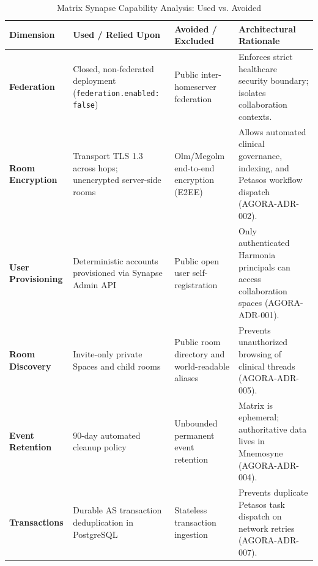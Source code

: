 \begin{table}[htbp]
\centering
\scriptsize
\begin{tabularx}{\textwidth}{P{3.0cm} P{3.8cm} P{3.8cm} Y}
\toprule
\textbf{Dimension} & \textbf{Used / Relied Upon} & \textbf{Avoided / Excluded} & \textbf{Architectural Rationale} \\
\midrule
\textbf{Federation} & Closed, non-federated deployment (\nolinkurl{federation.enabled: false}) & Public inter-homeserver federation & Enforces strict healthcare security boundary; isolates collaboration contexts. \\
\addlinespace
\textbf{Room Encryption} & Transport TLS 1.3 across hops; unencrypted server-side rooms & Olm/Megolm end-to-end encryption (E2EE) & Allows automated clinical governance, indexing, and Petasos workflow dispatch (AGORA-ADR-002). \\
\addlinespace
\textbf{User Provisioning} & Deterministic accounts provisioned via Synapse Admin API & Public open user self-registration & Only authenticated Harmonia principals can access collaboration spaces (AGORA-ADR-001). \\
\addlinespace
\textbf{Room Discovery} & Invite-only private Spaces and child rooms & Public room directory and world-readable aliases & Prevents unauthorized browsing of clinical threads (AGORA-ADR-005). \\
\addlinespace
\textbf{Event Retention} & 90-day automated cleanup policy & Unbounded permanent event retention & Matrix is ephemeral; authoritative data lives in Mnemosyne (AGORA-ADR-004). \\
\addlinespace
\textbf{Transactions} & Durable AS transaction deduplication in PostgreSQL & Stateless transaction ingestion & Prevents duplicate Petasos task dispatch on network retries (AGORA-ADR-007). \\
\bottomrule
\end{tabularx}
\caption{Matrix Synapse Capability Analysis: Used vs. Avoided}
\label{tab:synapse_used_vs_avoided}
\end{table}

\newpage
